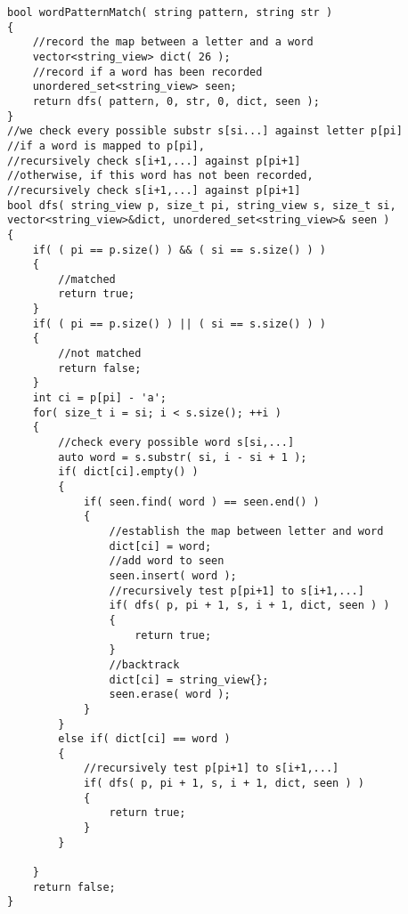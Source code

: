 \setcounter{lstlisting}{0}
\begin{lstlisting}[style=customc, caption={Backtracking}]
bool wordPatternMatch( string pattern, string str )
{
    //record the map between a letter and a word
    vector<string_view> dict( 26 );
    //record if a word has been recorded
    unordered_set<string_view> seen;
    return dfs( pattern, 0, str, 0, dict, seen );
}
//we check every possible substr s[si...] against letter p[pi]
//if a word is mapped to p[pi],
//recursively check s[i+1,...] against p[pi+1]
//otherwise, if this word has not been recorded,
//recursively check s[i+1,...] against p[pi+1]
bool dfs( string_view p, size_t pi, string_view s, size_t si, vector<string_view>&dict, unordered_set<string_view>& seen )
{
    if( ( pi == p.size() ) && ( si == s.size() ) )
    {
        //matched
        return true;
    }
    if( ( pi == p.size() ) || ( si == s.size() ) )
    {
        //not matched
        return false;
    }
    int ci = p[pi] - 'a';
    for( size_t i = si; i < s.size(); ++i )
    {
        //check every possible word s[si,...]
        auto word = s.substr( si, i - si + 1 );
        if( dict[ci].empty() )
        {
            if( seen.find( word ) == seen.end() )
            {
                //establish the map between letter and word
                dict[ci] = word;
                //add word to seen
                seen.insert( word );
                //recursively test p[pi+1] to s[i+1,...]
                if( dfs( p, pi + 1, s, i + 1, dict, seen ) )
                {
                    return true;
                }
                //backtrack
                dict[ci] = string_view{};
                seen.erase( word );
            }
        }
        else if( dict[ci] == word )
        {
            //recursively test p[pi+1] to s[i+1,...]
            if( dfs( p, pi + 1, s, i + 1, dict, seen ) )
            {
                return true;
            }
        }

    }
    return false;
}
\end{lstlisting}